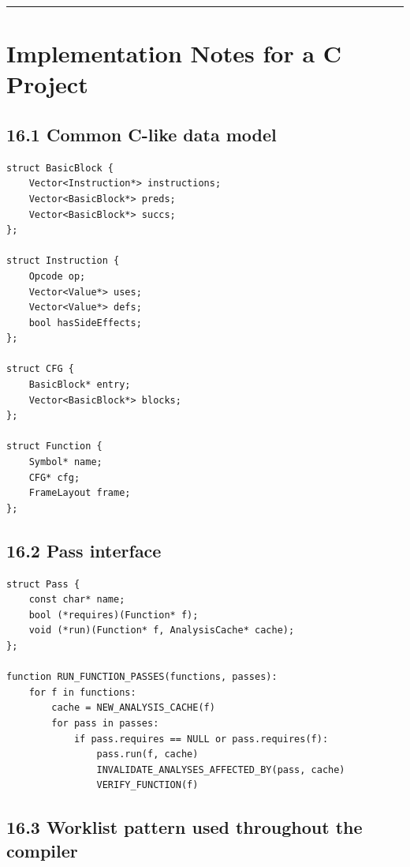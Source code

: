 \documentclass[10pt,letterpaper]{article}
\begin{document}
\medskip\hrule\medskip

\clearpage
\section{Implementation Notes for a C Project}

\subsection*{16.1 Common C-like data model}
{}

\begin{verbatim}
struct BasicBlock {
    Vector<Instruction*> instructions;
    Vector<BasicBlock*> preds;
    Vector<BasicBlock*> succs;
};

struct Instruction {
    Opcode op;
    Vector<Value*> uses;
    Vector<Value*> defs;
    bool hasSideEffects;
};

struct CFG {
    BasicBlock* entry;
    Vector<BasicBlock*> blocks;
};

struct Function {
    Symbol* name;
    CFG* cfg;
    FrameLayout frame;
};
\end{verbatim}

\subsection*{16.2 Pass interface}
{}

\begin{verbatim}
struct Pass {
    const char* name;
    bool (*requires)(Function* f);
    void (*run)(Function* f, AnalysisCache* cache);
};

function RUN_FUNCTION_PASSES(functions, passes):
    for f in functions:
        cache = NEW_ANALYSIS_CACHE(f)
        for pass in passes:
            if pass.requires == NULL or pass.requires(f):
                pass.run(f, cache)
                INVALIDATE_ANALYSES_AFFECTED_BY(pass, cache)
                VERIFY_FUNCTION(f)
\end{verbatim}

\subsection*{16.3 Worklist pattern used throughout the compiler}
{}
\end{document}
